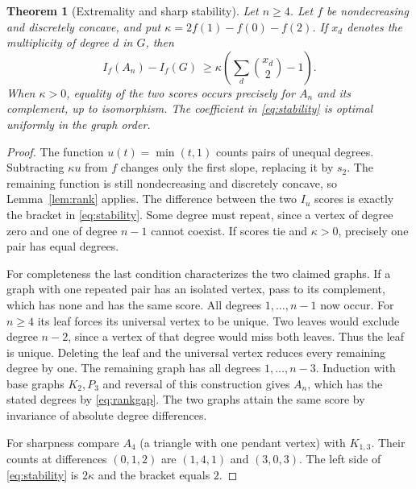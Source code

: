 \documentclass[11pt,a4paper]{article}
\newtheorem{theorem}{Theorem}[section]
\theoremstyle{definition}\newtheorem{problem}[theorem]{Problem}
\begin{document}
\begin{theorem}[Extremality and sharp stability]\label{thm:rank}
Let $n\ge4$. Let $f$ be nondecreasing and discretely concave, and put
$\kappa=2f(1)-f(0)-f(2)$. If $x_d$ denotes the multiplicity of degree
$d$ in $G$, then
\begin{equation}\label{eq:stability}
 I_f(A_n)-I_f(G)\ \ge \kappa\left(\sum_d\binom{x_d}{2}-1\right).
\end{equation}
When $\kappa>0$, equality of the two scores occurs precisely for $A_n$
and its complement, up to isomorphism. The coefficient in
\eqref{eq:stability} is optimal uniformly in the graph order.
\end{theorem}
\begin{proof}
The function $u(t)=\min(t,1)$ counts pairs of unequal degrees.
Subtracting $\kappa u$ from $f$ changes only the first slope, replacing
it by $s_2$. The remaining function is still nondecreasing and
discretely concave, so Lemma~\ref{lem:rank} applies. The difference
between the two $I_u$ scores is exactly the bracket in
\eqref{eq:stability}. Some degree must repeat, since a vertex of degree
zero and one of degree $n-1$ cannot coexist. If scores tie and
$\kappa>0$, precisely one pair has equal degrees.

For completeness the last condition characterizes the two claimed
graphs. If a graph with one repeated pair has an isolated vertex, pass
to its complement, which has none and has the same score. All degrees
$1,\ldots,n-1$ now occur. For $n\ge4$ its leaf forces its universal
vertex to be unique. Two leaves would exclude degree $n-2$, since a
vertex of that degree would miss both leaves. Thus the leaf is unique.
Deleting the leaf and the universal vertex reduces every remaining
degree by one. The remaining graph has all degrees $1,\ldots,n-3$.
Induction with base graphs $K_2,P_3$ and reversal of this construction
gives $A_n$, which has the stated degrees by \eqref{eq:rankgap}.
The two graphs attain the same score by invariance of absolute
degree differences.

For sharpness compare $A_4$ (a triangle with one pendant vertex) with $K_{1,3}$. Their counts at
differences $(0,1,2)$ are $(1,4,1)$ and $(3,0,3)$. The left side
of \eqref{eq:stability} is $2\kappa$ and the bracket equals $2$.
\end{proof}
\end{document}
